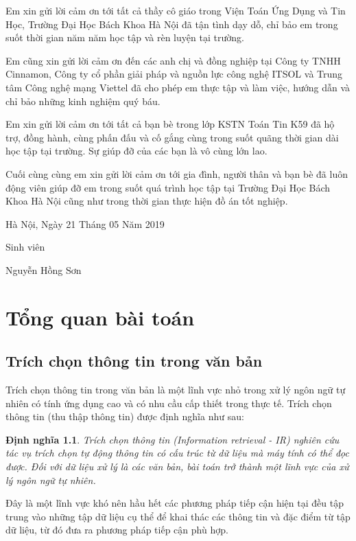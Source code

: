 \documentclass[14pt]{extreport}
\newtheorem{definition}{\MakeUppercase{Đ}ịnh nghĩa}[chapter]
\begin{document}
Em xin gửi lời cảm ơn tới tất cả thầy cô giáo trong Viện Toán Ứng Dụng và Tin Học, Trường Đại Học Bách Khoa Hà Nội đã tận tình dạy dỗ, chỉ bảo em trong suốt thời gian năm năm học tập và rèn luyện tại trường.

Em cũng xin gửi lời cảm ơn đến các anh chị và đồng nghiệp tại Công ty TNHH Cinnamon, Công ty cổ phần giải pháp và nguồn lực công nghệ ITSOL và Trung tâm Công nghệ mạng Viettel đã cho phép em thực tập và làm việc, hướng dẫn và chỉ bảo những kinh nghiệm quý báu.

Em xin gửi lời cảm ơn tới tất cả bạn bè trong lớp KSTN Toán Tin K59 đã hộ trợ, đồng hành, cùng phấn đấu và cố gắng cùng trong suốt quãng thời gian dài học tập tại trường. Sự giúp đỡ của các bạn là vô cùng lớn lao.

Cuối cùng cùng em xin gửi lời cảm ơn tới gia đình, người thân và bạn bè đã luôn động viên giúp đỡ em trong suốt quá trình học tập tại Trường Đại Học Bách Khoa Hà Nội cũng như trong thời gian thực hiện đồ án tốt nghiệp.

Hà Nội, Ngày 21 Tháng 05 Năm 2019

Sinh viên

Nguyễn Hồng Sơn


\chapter{Tổng quan bài toán}

\section{Trích chọn thông tin trong văn bản}
Trích chọn thông tin trong văn bản là một lĩnh vực nhỏ trong xử lý ngôn ngữ tự nhiên có tính ứng dụng cao và có nhu cầu cấp thiết trong thực tế. Trích chọn thông tin (thu thập thông tin) được định nghĩa như sau:
\begin{definition}
Trích chọn thông tin (Information retrieval - IR) nghiên cứu tác vụ trích chọn tự động thông tin có cấu trúc từ dữ liệu mà máy tính có thể đọc được. Đối với dữ liệu xử lý là các văn bản, bài toán trở thành một lĩnh vực của xử lý ngôn ngữ tự nhiên. 
\end{definition}
Đây là một lĩnh vực khó nên hầu hết các phương pháp tiếp cận hiện tại đều tập trung vào những tập dữ liệu cụ thể để khai thác các thông tin và đặc điểm từ tập dữ liệu, từ đó đưa ra phương pháp tiếp cận phù hợp.
\end{document}
